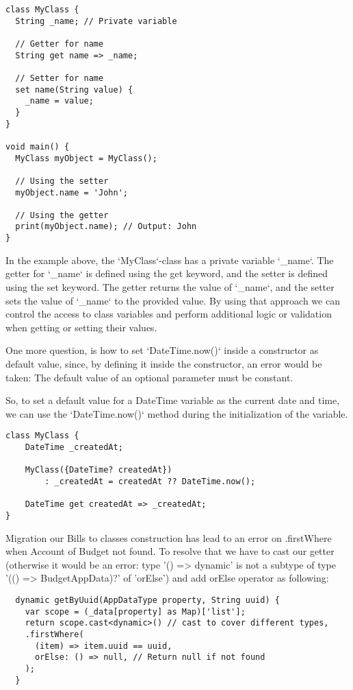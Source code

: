 \begin{lstlisting}
class MyClass {
  String _name; // Private variable

  // Getter for name
  String get name => _name;

  // Setter for name
  set name(String value) {
    _name = value;
  }
}

void main() {
  MyClass myObject = MyClass();

  // Using the setter
  myObject.name = 'John';

  // Using the getter
  print(myObject.name); // Output: John
}
\end{lstlisting}

In the example above, the `MyClass`-class has a private variable `\_name`. The getter for `\_name` is defined 
using the get keyword, and the setter is defined using the set keyword. The getter returns the value of 
`\_name`, and the setter sets the value of `\_name` to the provided value. By using that approach we can control 
the access to class variables and perform additional logic or validation when getting or setting their values.

One more question, is how to set `DateTime.now()` inside a constructor as default value, since, by defining it inside
the constructor, an error would be taken: The default value of an optional parameter must be constant.

So, to set a default value for a DateTime variable as the current date and time, we can use the `DateTime.now()` method 
during the initialization of the variable.

\begin{lstlisting}
class MyClass {
    DateTime _createdAt;

    MyClass({DateTime? createdAt})
        : _createdAt = createdAt ?? DateTime.now();

    DateTime get createdAt => _createdAt;
}
\end{lstlisting}

Migration our Bills to classes construction has lead to an error on .firstWhere when Account of Budget not found. 
To resolve that we have to cast our getter (otherwise it would be an error: type '() => dynamic' is not a subtype 
of type '(() => BudgetAppData)?' of 'orElse') and add orElse operator as following:

\begin{lstlisting}
  dynamic getByUuid(AppDataType property, String uuid) {
    var scope = (_data[property] as Map)['list'];
    return scope.cast<dynamic>() // cast to cover different types, 
    .firstWhere(
      (item) => item.uuid == uuid,
      orElse: () => null, // Return null if not found
    );
  }
\end{lstlisting}

